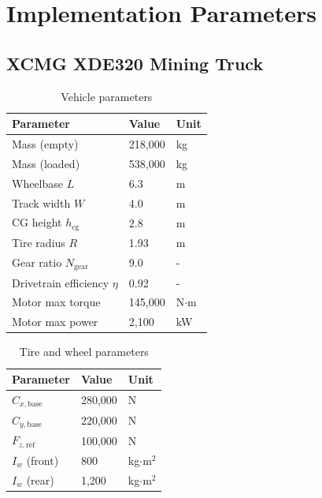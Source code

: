 \documentclass[11pt,a4paper]{article}
\begin{document}
\section{Implementation Parameters}

\subsection{XCMG XDE320 Mining Truck}

\begin{table}[H]
\centering
\begin{tabular}{lll}
\toprule
\textbf{Parameter} & \textbf{Value} & \textbf{Unit} \\
\midrule
Mass (empty) & 218,000 & kg \\
Mass (loaded) & 538,000 & kg \\
Wheelbase $L$ & 6.3 & m \\
Track width $W$ & 4.0 & m \\
CG height $h_{\text{cg}}$ & 2.8 & m \\
Tire radius $R$ & 1.93 & m \\
Gear ratio $N_{\text{gear}}$ & 9.0 & - \\
Drivetrain efficiency $\eta$ & 0.92 & - \\
Motor max torque & 145,000 & N$\cdot$m \\
Motor max power & 2,100 & kW \\
\bottomrule
\end{tabular}
\caption{Vehicle parameters}
\end{table}

\begin{table}[H]
\centering
\begin{tabular}{lll}
\toprule
\textbf{Parameter} & \textbf{Value} & \textbf{Unit} \\
\midrule
$C_{x,\text{base}}$ & 280,000 & N \\
$C_{y,\text{base}}$ & 220,000 & N \\
$F_{z,\text{ref}}$ & 100,000 & N \\
$I_w$ (front) & 800 & kg$\cdot$m$^2$ \\
$I_w$ (rear) & 1,200 & kg$\cdot$m$^2$ \\
\bottomrule
\end{tabular}
\caption{Tire and wheel parameters}
\end{table}

\end{document}
